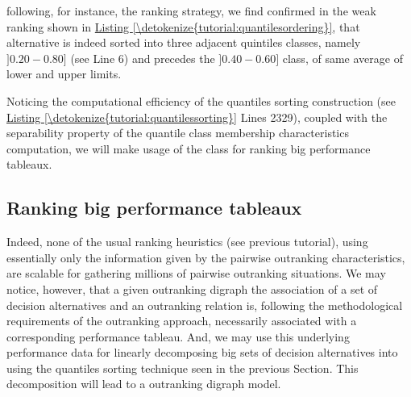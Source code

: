 \documentclass[a4paper,12pt,english]{sphinxhowto}
\begin{document}
following, for instance, the  ranking strategy, we find confirmed in the weak ranking shown in \hyperref[\detokenize{tutorial:quantilesordering}]{Listing \ref{\detokenize{tutorial:quantilesordering}}},  that alternative   is indeed sorted into three adjacent quintiles classes, namely \(]0.20-0.80]\) (see Line 6) and precedes the \(]0.40-0.60]\) class, of same average of lower and upper limits.

Noticing the computational efficiency of the quantiles sorting construction (see \hyperref[\detokenize{tutorial:quantilessorting}]{Listing \ref{\detokenize{tutorial:quantilessorting}}} Lines 23\sphinxhyphen{}29), coupled with the separability property of the quantile class membership characteristics computation, we will make usage of the  class for ranking big performance tableaux.


\subsection{Ranking big performance tableaux}
\label{\detokenize{tutorial:ranking-big-performance-tableaux}}
Indeed, none of the usual ranking heuristics (see previous tutorial), using essentially only the information given by the pairwise outranking characteristics, are scalable for  gathering millions of pairwise outranking situations. We may notice, however, that a given outranking digraph \sphinxhyphen{}the association of a set of decision alternatives and an outranking relation\sphinxhyphen{} is, following the methodological requirements of the outranking approach, necessarily associated with a corresponding performance tableau. And, we may use this underlying performance data for linearly decomposing big sets of decision alternatives into  using the quantiles sorting technique seen in the previous Section. This decomposition will lead to a  outranking digraph model.
\end{document}

